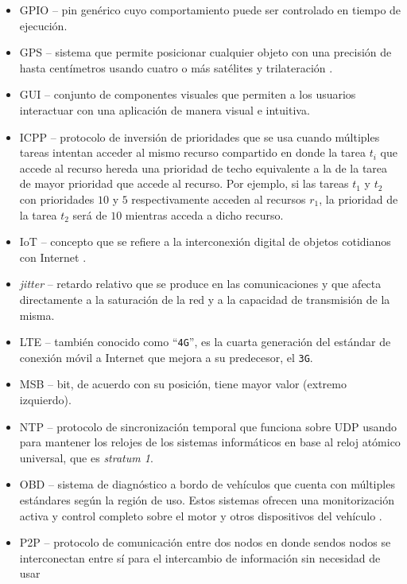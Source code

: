 \begin{itemize}
  \item \ac{GPIO} -- pin genérico cuyo comportamiento puede ser controlado en tiempo
        de ejecución.
  \item \ac{GPS} -- sistema que permite posicionar cualquier objeto con una 
        precisión de hasta centímetros usando cuatro o más satélites y 
        trilateración \cite{GPS2021}.
  \item \ac{GUI} -- conjunto de componentes visuales que permiten a los usuarios
        interactuar con una aplicación de manera visual e intuitiva.
  \item \ac{ICPP} -- protocolo de inversión de prioridades que se usa cuando múltiples
        tareas intentan acceder al mismo recurso compartido en donde la tarea $t_i$ que
        accede al recurso hereda una prioridad de techo equivalente a la de la tarea
        de mayor prioridad que accede al recurso. Por ejemplo, si las tareas $t_1$ y
        $t_2$ con prioridades $10$ y $5$ respectivamente acceden al recursos $r_1$, la
        prioridad de la tarea $t_2$ será de $10$ mientras acceda a dicho recurso.
  \item \ac{IoT} -- concepto que se refiere a la interconexión digital de objetos 
        cotidianos con Internet \cite{InternetCosas2021}.
  \item \textit{jitter} -- retardo relativo que se produce en las comunicaciones
        y que afecta directamente a la saturación de la red y a la capacidad de
        transmisión de la misma.
  \item \ac{LTE} -- también conocido como ``\texttt{4G}'', es la cuarta generación
        del estándar de conexión móvil a Internet que mejora a su predecesor, el \texttt{3G}.
  \item \ac{MSB} -- bit, de acuerdo con su posición, tiene mayor valor (extremo izquierdo).
  \item \ac{NTP} -- protocolo de sincronización temporal que funciona sobre UDP usando para mantener
        los relojes de los sistemas informáticos en base al reloj atómico universal, que
        es \textit{stratum 1}.
  \item \ac{OBD} -- sistema de diagnóstico a bordo de vehículos que cuenta con múltiples estándares según la región de uso. Estos
        sistemas ofrecen una monitorización activa y control completo
        sobre el motor y otros dispositivos del vehículo \cite{OBD2021}.
  \item \ac{P2P} -- protocolo de comunicación entre dos nodos en donde sendos nodos se
        interconectan entre sí para el intercambio de información sin necesidad de usar

\end{itemize}
